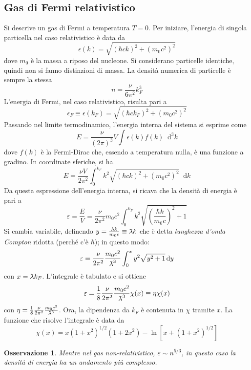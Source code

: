 \documentclass[11pt, a4paper]{scrartcl}
\theoremstyle{style}
\newtheorem{osservazione}{Osservazione}[section]
\newcommand{\dd}{\mathop{}\!\mathrm{d}}
\numberwithin{equation}{subsection}
\newcommand{\lbar}{{\mkern0.75mu\mathchar '26\mkern -9.75mu\lambda}}
\begin{document}
\subsection{Gas di Fermi relativistico}
Si descrive un gas di Fermi a temperatura $T=0$.
Per iniziare, l'energia di singola particella nel caso relativistico \`e data da
\[
\epsilon (k) = \sqrt{(\hbar c k)^2 + (m_0 c^2)^2} 
\] 
dove $m_0$ \`e la massa a riposo del nucleone. 
Si considerano particelle identiche, quindi non si fanno distinzioni di massa.
La densit\`a numerica di particelle \`e sempre la stessa
\[
n = \frac{\nu }{6 \pi ^2} k_F^3
\] 
L'energia di Fermi, nel caso relativistico, risulta pari a 
\[
\epsilon _F \equiv \epsilon (k_F) = \sqrt{\left(\hbar c k_F\right) ^2 + \left(m_0c^2\right) ^2} 
\] 
Passando nel limite termodinamico, l'energia interna del sistema si esprime come 
\[
E = \frac{\nu }{(2\pi)^3}V \int \epsilon (k) f(k) \dd ^3 k
\] 
dove $f(k)$ \`e la Fermi-Dirac che, essendo a temperatura nulla, \`e una funzione a gradino. 
In coordinate sferiche, si ha
\[
	E = \frac{\nu V}{2\pi^2} \int_0^{k_F} k^2 \sqrt{(\hbar c k )^2 + (m_0c^2)^2}  \dd k
\] 
Da questa espressione dell'energia interna, si ricava che la densit\`a di energia \`e pari a 
\[
\varepsilon = \frac{E}{V} = \frac{\nu }{2\pi^2}m_0c^2 \int _0^{k_F} k^2 \sqrt{\left(\frac{\hbar k}{m_0c}\right) ^2 + 1} 
\] 
Si cambia variabile, definendo $y = \frac{\hbar k}{m_0 c} \equiv \lbar k$ che \`e detta \textit{lunghezza d'onda Compton} ridotta (perch\'e c'\`e $\hbar $); in questo modo:
\[
	\varepsilon   = \frac{\nu }{2\pi^2} \frac{m_0 c^2}{\lbar^3} \int _0^{x}y^2 \sqrt{y^2 + 1}  \dd y
\] 
con $x= \lbar k_F$.
L'integrale \`e tabulato e si ottiene
\[
\varepsilon = \frac{1}{8} \frac{\nu }{2 \pi^2} \frac{m_0 c^2}{\lbar^3} \chi(x) \equiv \eta \chi (x) 
\]
con $\eta  = \frac{1}{8} \frac{\nu }{2\pi^2}  \frac{m_0c^2}{\lbar^3}$.
Ora, la dipendenza da $k_F$ \`e contenuta in $\chi $ tramite $x$.
La funzione che risolve l'integrale \`e data da 
\[
\chi (x) = x (1+x^2)^{1 / 2} \left(1 + 2x^2\right) - \ln\left[x + (1+x^2)^{1 / 2}\right] 
\] 

\begin{osservazione}
Mentre nel gas non-relativistico, $\varepsilon \sim n^{5/3}$, in questo caso la densit\`a di energia ha un andamento pi\`u complesso.
\end{osservazione}
\end{document}
